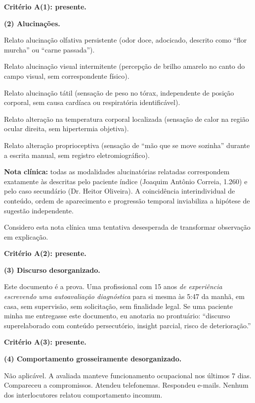 \noindent \textbf{Critério A(1): presente.}

\noindent \textbf{(2) Alucinações.}

\noindent Relato alucinação olfativa persistente (odor doce,
\noindent adocicado, descrito como ``flor murcha'' ou ``carne passada'').

\noindent Relato alucinação visual intermitente (percepção de
\noindent brilho amarelo no canto do campo visual, sem correspondente físico).

\noindent Relato alucinação tátil (sensação de peso no tórax,
\noindent independente de posição corporal, sem causa cardíaca ou respiratória
\noindent identificável).

\noindent Relato alteração na temperatura corporal localizada
\noindent (sensação de calor na região ocular direita, sem hipertermia objetiva).

\noindent Relato alteração proprioceptiva (sensação de ``mão
\noindent que se move sozinha'' durante a escrita manual, sem registro
\noindent eletromiográfico).

\noindent \textbf{Nota clínica:} todas as modalidades alucinatórias
\noindent relatadas correspondem exatamente às descritas pelo paciente índice
\noindent (Joaquim Antônio Correia, 1.260) e pelo caso secundário (Dr. Heitor
\noindent Oliveira). A coincidência interindividual de conteúdo, ordem de
\noindent aparecimento e progressão temporal inviabiliza a hipótese de
\noindent sugestão independente.

\noindent Considero esta nota clínica uma tentativa desesperada de
\noindent transformar observação em explicação.

\noindent \textbf{Critério A(2): presente.}

\noindent \textbf{(3) Discurso desorganizado.}

\noindent Este documento é a prova. Uma profissional com 15 anos
\noindent \textit{de experiência escrevendo uma autoavaliação diagnóstica }para si mesma
\noindent às 5:47 da manhã, em casa, sem supervisão, sem solicitação, sem
\noindent finalidade legal. Se uma paciente minha me entregasse este documento,
\noindent eu anotaria no prontuário: ``discurso superelaborado com conteúdo
\noindent persecutório, insight parcial, risco de deterioração.''

\noindent \textbf{Critério A(3): presente.}

\noindent \textbf{(4) Comportamento grosseiramente desorganizado.}

\noindent Não aplicável. A avaliada manteve funcionamento
\noindent ocupacional nos últimos 7 dias. Compareceu a compromissos. Atendeu
\noindent telefonemas. Respondeu e-mails. Nenhum dos interlocutores relatou
\noindent comportamento incomum.

